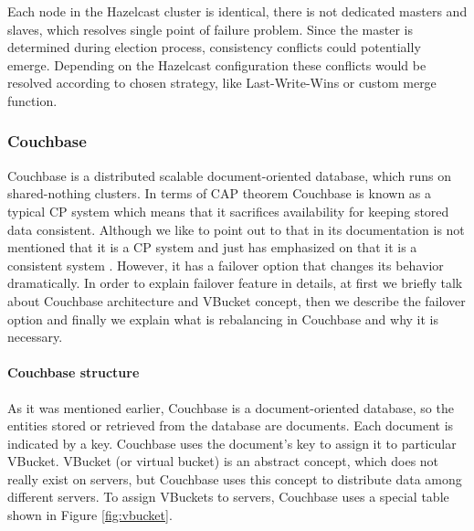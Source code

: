 \documentclass[a4paper]{article}
\begin{document}
Each node in the Hazelcast cluster is identical, there is not dedicated masters and slaves, which resolves single point of failure problem.
Since the master is determined during election process, consistency conflicts could potentially emerge.
Depending on the Hazelcast configuration these conflicts would be resolved according to chosen strategy, like Last-Write-Wins or custom merge function. 

\subsubsection{Couchbase}

Couchbase is a distributed scalable document-oriented database, which runs on shared-nothing clusters.
In terms of CAP theorem Couchbase is known as a typical CP system \cite{Couchbasewiki} which means that it sacrifices availability for keeping stored data consistent.
Although we like to point out to that in its documentation is not mentioned that it is a CP system and just has emphasized on that it is a consistent system \cite{Couchbasedoc}.  
However, it has a failover option that changes its behavior dramatically. 
In order to explain failover feature in details, at first we briefly talk about Couchbase architecture and VBucket concept, then we describe the failover option and finally we explain what is rebalancing in Couchbase and why it is necessary.

\paragraph{Couchbase structure}
As it was mentioned earlier, Couchbase is a document-oriented database, so the entities stored or retrieved from the database are documents. 
Each document is indicated by a key.
Couchbase uses the document's key to assign it to particular VBucket. 
VBucket (or virtual bucket) is an abstract concept, which does not really exist on servers, but Couchbase uses this concept to distribute data among different servers. 
To assign VBuckets to servers, Couchbase uses a special table shown in Figure \ref{fig:vbucket}.
\end{document}
